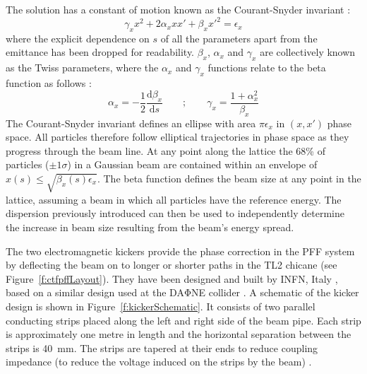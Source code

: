 The solution has a constant of motion known as the Courant-Snyder invariant \cite{courant}:
\begin{equation}
\gamma_x x^2 + 2\alpha_x x x' + \beta_x x'^2 = \epsilon_x 
\end{equation}
where the explicit dependence on \(s\) of all the parameters apart from the emittance has been dropped for readability. \(\beta_{x}\), \(\alpha_{x}\) and \(\gamma_{x}\) are collectively known as the Twiss parameters, where the \(\alpha_x\) and \(\gamma_x\) functions relate to the beta function as follows \cite{wilson}:
\begin{equation}
\alpha_x = -\frac{1}{2}\frac{\mathrm{d}\beta_x}{\mathrm{d}s}
\qquad\mathrm{;}\qquad
\gamma_x = \frac{1+\alpha_x^2}{\beta_x}
\end{equation}
The Courant-Snyder invariant defines an ellipse with area \(\pi\epsilon_x\) in \((x, x')\) phase space. All particles therefore follow elliptical trajectories in phase space as they progress through the beam line. At any point along the lattice the 68\% of particles (\(\pm 1\sigma\)) in a Gaussian beam are contained within an envelope of \(x(s) \leq \sqrt{\beta_x(s)\epsilon_x}\). The beta function defines the beam size at any point in the lattice, assuming a beam in which all particles have the reference energy. The dispersion previously introduced can then be used to independently determine the increase in beam size resulting from the beam's energy spread.


The two electromagnetic kickers provide the phase correction in the PFF system by deflecting the beam on to longer or shorter paths in the TL2 chicane (see Figure~\ref{f:ctfpffLayout}). They have been designed and built by INFN, Italy \cite{infn}, based on a similar design used at the DA\(\mathrm{\Phi}\)NE collider \cite{dafneKick}. A schematic of the kicker design is shown in Figure~\ref{f:kickerSchematic}. It consists of two parallel conducting strips placed along the left and right side of the beam pipe. Each strip is approximately one metre in length and the horizontal separation between the strips is 40~mm. The strips are tapered at their ends to reduce coupling impedance (to reduce the voltage induced on the strips by the beam) \cite{kickerIPAC11}.

